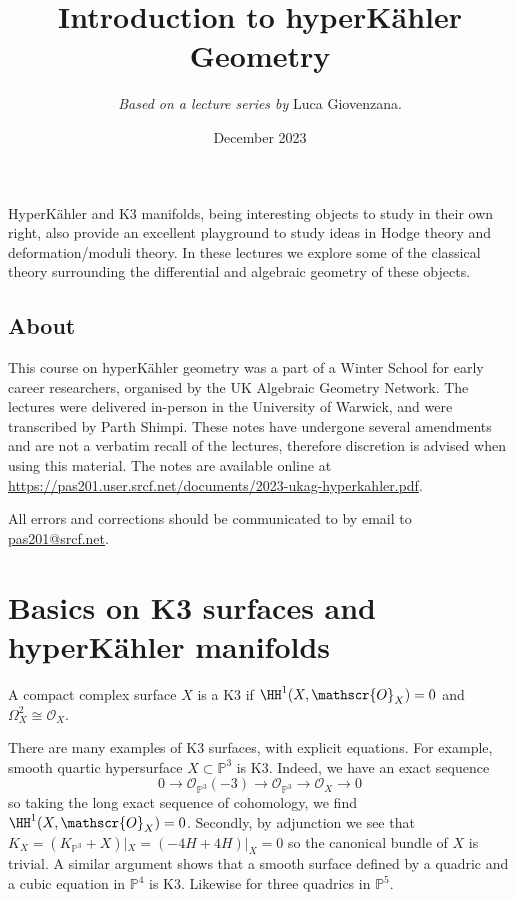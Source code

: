 \title{Introduction to hyperK\"ahler Geometry}
\author{\textit{Based on a lecture series by }Luca Giovenzana.}
\date{December 2023}
\maketitle

\newcommand{\Def}{\mathop{\mathcal{D\kern -0.5pt e\kern -0.5pt f\kern -1pt}}}
\newcommand{\Moduli}{\ensuremath{\mathscr{M}}}

HyperK\"ahler and K3 manifolds, being interesting objects to study in their own
right, also provide an excellent playground to study ideas in Hodge theory and
deformation/moduli theory. In these lectures we explore some of the
classical theory surrounding the differential and algebraic geometry of these
objects.

\subsection{About} This course on hyperK\"ahler geometry was a part of a Winter School for early career researchers, organised by the UK Algebraic
Geometry Network. The lectures were delivered in-person in the University of Warwick, and were transcribed by Parth Shimpi. These notes have undergone several amendments and are not a verbatim recall of the lectures, therefore discretion is advised when using this material. The notes are available online at
\url{https://pas201.user.srcf.net/documents/2023-ukag-hyperkahler.pdf}. 

All errors and corrections should be communicated to by email to
\url{pas201@srcf.net}.

\section{Basics on K3 surfaces and hyperK\"ahler manifolds}

\begin{definition}
    A compact complex surface \(X\) is a K3 if \(\HH^1(X,\mathscr{O}_X)=0\) and
    \(\Omega^2_X\cong \mathscr{O}_X\).
\end{definition}

\begin{example}
    There are many examples of K3 surfaces, with explicit equations. For
    example, smooth quartic hypersurface \(X\subset \mathbb{P}^3\) is K3.
    Indeed, we have an exact sequence
    \[
        0\to \mathscr{O}_{\mathbb{P}^3}(-3)\to \mathscr{O}_{\mathbb{P}^3}\to
        \mathscr{O}_X\to 0
    \]
    so taking the long exact sequence of cohomology, we find
    \(\HH^1(X,\mathscr{O}_X)=0\). Secondly, by adjunction we see that
    \(K_X=(K_{\mathbb{P}^3}+X)|_X=(-4H+4H)|_X = 0\) so the canonical bundle of
    \(X\) is trivial. A similar argument shows that a smooth surface defined by
    a quadric and a cubic equation in \(\mathbb{P}^4\) is K3. Likewise for three
    quadrics in \(\mathbb{P}^5\).
\end{example}

